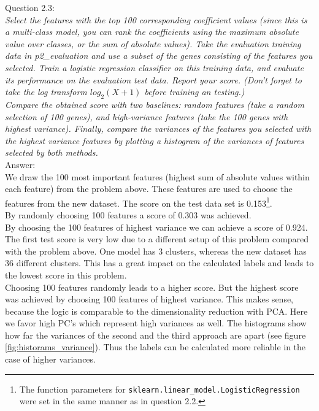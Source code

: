 
Question 2.3:\\	
\textsl{Select the features with the top 100 corresponding coefficient values (since this is a multi-class model, you can rank the coefficients using the maximum absolute value over classes, or the sum of absolute values). Take the evaluation training data in p2\_evaluation and use a subset of the genes consisting of the features you selected. Train a logistic regression classifier on this training data, and evaluate its performance on the evaluation test data. Report your score. (Don't forget to take the log transform $log_2(X+1)$ before training an testing.)}\\
\textsl{Compare the obtained score with two baselines: random features (take a random selection of 100 genes), and high-variance features (take the 100 genes with highest variance). Finally, compare the variances of the features you selected with the highest variance features by plotting a histogram of the variances of features selected by both methods.}\\

Answer:\\
We draw the 100 most important features (highest sum of absolute values within each feature) from the problem above. These features are used to choose the features from the new dataset. The score on the test data set is 0.153\footnote{The function parameters for \texttt{sklearn.linear\_model.LogisticRegression} were set in the same manner as in question 2.2.}.\\

By randomly choosing 100 features a score of 0.303 was achieved.\\

By choosing the 100 features of highest variance we can achieve a score of 0.924.\\

The first test score is very low due to a different setup of this problem compared with the problem above. One model has 3 clusters, whereas the new dataset has 36 different clusters. This has a great impact on the calculated labels and leads to the lowest score in this problem.\\

Choosing 100 features randomly leads to a higher score. But the highest score was achieved by choosing 100 features of highest variance. This makes sense, because the logic is comparable to the dimensionality reduction with PCA. Here we favor high PC's which represent high variances as well. The histograms show how far the variances of the second and the third approach are apart (see figure \ref{fig:historams_variance}). Thus the labels can be calculated more reliable in the case of higher variances.\\

